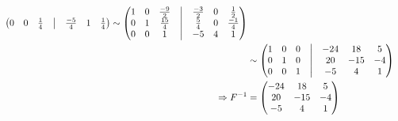 \documentclass[12pt, letterpaper]{article}
\begin{document}
\begin{enumerate}
\begin{equation*}
\begin{aligned}
\begin{pmatrix}
                0 & 0 & \frac{1}{4} &\bigm| & \frac{-5}{4} & 1 & \frac{1}{4}
            \end{pmatrix}
            \sim
            \begin{pmatrix}
                1 & 0 & \frac{-9}{2} &\bigm| & \frac{-3}{2} & 0 & \frac{1}{2} \\
                0 & 1 & \frac{15}{4} &\bigm| & \frac{5}{4} & 0 & \frac{-1}{4} \\
                0 & 0 & 1 &\bigm| & -5 & 4 & 1
            \end{pmatrix} \\
            & \sim
            \begin{pmatrix}
                1 & 0 & 0 &\bigm| & -24 & 18 & 5 \\
                0 & 1 & 0 &\bigm| & 20 & -15 & -4 \\
                0 & 0 & 1 &\bigm| & -5 & 4 & 1
            \end{pmatrix} \\
            \Rightarrow F^{-1}
            & = 
            \begin{pmatrix}
                -24 & 18 & 5 \\
                20 & -15 & -4 \\
                -5 & 4 & 1
            \end{pmatrix}
        \end{aligned}
    \end{equation*}

\end{enumerate}
\end{document}
